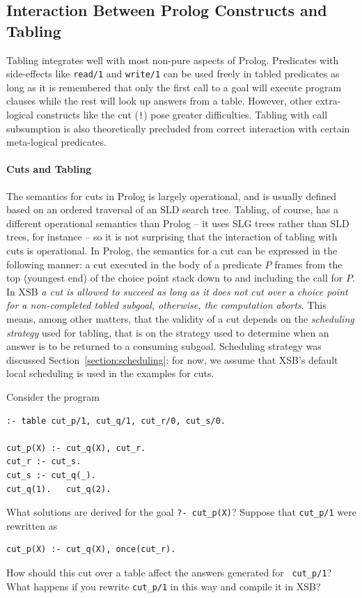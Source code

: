 \subsection{Interaction Between Prolog Constructs and Tabling}

Tabling integrates well with most non-pure aspects of Prolog.
Predicates with side-effects like {\tt read/1} and {\tt write/1} can
be used freely in tabled predicates as long as it is remembered that
only the first call to a goal will execute program clauses while the
rest will look up answers from a table.  However, other extra-logical
constructs like the cut (\texttt{!}) pose greater difficulties.
Tabling with call subsumption is also theoretically precluded from
correct interaction with certain meta-logical predicates.

\paragraph{Cuts and Tabling} \label{sec:cuts}

The semantics for cuts in Prolog is largely operational, and is
usually defined based on an ordered traversal of an SLD search tree.
Tabling, of course, has a different operational semantics than Prolog
-- it uses SLG trees rather than SLD trees, for instance -- so it is
not surprising that the interaction of tabling with cuts is
operational.  In Prolog, the semantics for a cut can be expressed in
the following manner: a cut executed in the body of a predicate $P$
frames from the top (youngest end) of the choice point stack down to
and including the call for $P$.  In XSB {\em a cut is allowed to
  succeed as long as it does not cut over a choice point for a
  non-completed tabled subgoal, otherwise, the computation aborts}.
This means, among other matters, that the validity of a cut depends on
the {\em scheduling strategy} used for tabling, that is on the
strategy used to determine when an answer is to be returned to a
consuming subgoal.  Scheduling strategy was discussed
Section~\ref{section:scheduling}: for now, we assume that XSB's
default local scheduling is used in the examples for cuts.

\begin{exercise} \label{ex:nocut}
Consider the program
\begin{verbatim}
:- table cut_p/1, cut_q/1, cut_r/0, cut_s/0.

cut_p(X) :- cut_q(X), cut_r.
cut_r :- cut_s.
cut_s :- cut_q(_).
cut_q(1).   cut_q(2).
\end{verbatim}
What solutions are derived for the goal {\tt ?- cut\_p(X)}\@?  Suppose
that {\tt cut\_p/1} were rewritten as
\begin{verbatim}
cut_p(X) :- cut_q(X), once(cut_r).
\end{verbatim}
How should this cut over a table affect the answers generated for {\tt
cut\_p/1}?  What happens if you rewrite {\tt cut\_p/1} in this way and
compile it in XSB?\fillBox
\end{exercise}

